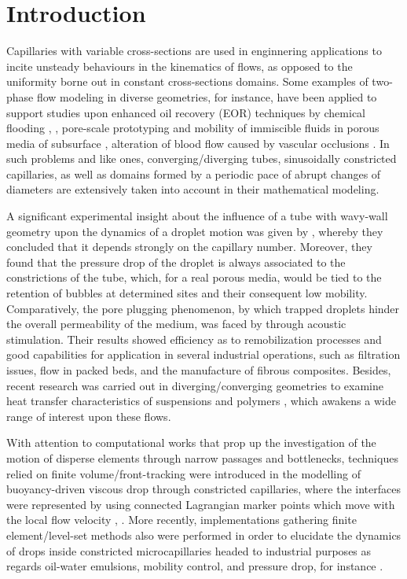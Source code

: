 \documentclass[12pt,fleqn]{article}
\begin{document}
\section{Introduction}

Capillaries with variable cross-sections are used in enginnering
applications to incite unsteady behaviours in the kinematics of flows, as
opposed to the uniformity borne out in constant cross-sections
domains. Some examples of two-phase flow modeling in diverse geometries,
for instance, have been applied to support studies upon enhanced oil
recovery (EOR) techniques by chemical flooding \cite{Olbricht1996}, \cite{Cobos2009}, 
pore-scale prototyping and mobility of immiscible fluids in porous media of 
subsurface \cite{Hemmat1996}, alteration of blood flow caused by
vascular occlusions \cite{Forsester1970}. In such problems and like ones, 
converging/diverging tubes, sinusoidally constricted capillaries, as 
well as domains formed by a periodic pace of abrupt changes of diameters
are extensively taken into account in their mathematical modeling.

A significant experimental insight about the influence of a tube with
wavy-wall geometry upon the dynamics of a droplet motion was given by
\cite{OlbrichtAndLeal1983}, whereby they concluded that it depends
strongly on the capillary number. Moreover, they found that the pressure
drop of the droplet is always associated to the constrictions of the
tube, which, for a real porous media, would be tied to the retention of
bubbles at determined sites and their consequent low mobility.
Comparatively, the pore plugging phenomenon, by which trapped droplets
hinder the overall permeability of the medium, was faced by \cite{Graham2000} 
through acoustic stimulation. Their results showed efficiency as to
remobilization processes and good capabilities for application in several
industrial operations, such as filtration issues, flow in packed beds,
and the manufacture of fibrous composites. Besides, recent research was
carried out in diverging/converging geometries to examine heat transfer
characteristics of suspensions and polymers \cite{Narayanam2014}, which
awakens a wide range of interest upon these flows.

With attention to computational works that prop up the investigation of
the motion of disperse elements through narrow passages and bottlenecks, techniques 
relied on finite volume/front-tracking were introduced in the modelling of
buoyancy-driven viscous drop through constricted capillaries, where the
interfaces were represented by using connected Lagrangian marker points
which move with the local flow velocity
\cite{MuradogluAndKayaalp2006:In:Olgac2006}, \cite{Olgac2006}.
More recently, implementations gathering finite element/level-set
methods also were performed in order to elucidate the dynamics of drops 
inside constricted microcapillaries headed to industrial purposes as
regards oil-water emulsions, mobility control, and pressure drop, for
instance \cite{Roca2013}. 
\end{document}
